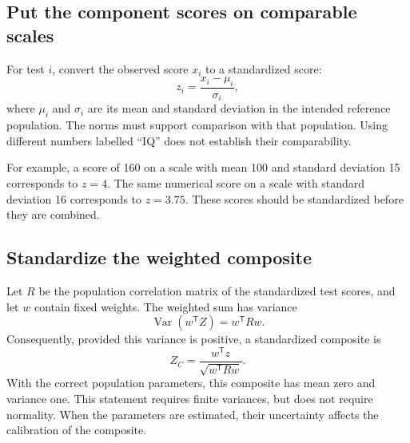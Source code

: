 \documentclass[
  a4paper,fontsize=11pt,parskip=half,headings=small,
  numbers=noenddot,bibliography=totoc
]{scrartcl}
\DeclareMathOperator{\Var}{Var}
\newcommand{\T}{\mathsf{T}}
\begin{document}
\subsection{Put the component scores on comparable scales}

For test \(i\), convert the observed score \(x_i\) to a standardized score:
\begin{equation}
  z_i=\frac{x_i-\mu_i}{\sigma_i},
  \label{eq:standardize}
\end{equation}
where \(\mu_i\) and \(\sigma_i\) are its mean and standard deviation in the
intended reference population. The norms must support comparison with that
population. Using different numbers labelled ``IQ'' does not establish
their comparability.

For example, a score of 160 on a scale with mean 100 and standard deviation
15 corresponds to \(z=4\). The same numerical score on a scale with standard
deviation 16 corresponds to \(z=3.75\). These scores should be standardized
before they are combined.

\subsection{Standardize the weighted composite}

Let \(R\) be the population correlation matrix of the standardized test
scores, and let \(w\) contain fixed weights. The weighted sum has variance
\begin{equation}
  \Var(w^\T Z)=w^\T Rw.
  \label{eq:weighted-variance}
\end{equation}
Consequently, provided this variance is positive, a standardized composite is
\begin{equation}
  \boxed{Z_C=\frac{w^\T z}{\sqrt{w^\T Rw}}.}
  \label{eq:weighted-composite}
\end{equation}
With the correct population parameters, this composite has mean zero and
variance one. This statement requires finite variances, but does not require
normality. When the parameters are estimated, their uncertainty affects the
calibration of the composite.
\end{document}
